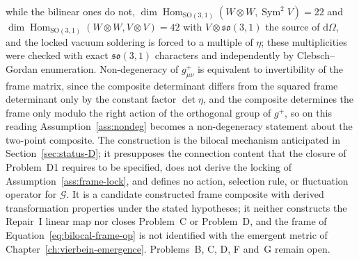while the bilinear ones do not,
$\dim\operatorname{Hom}_{\mathrm{SO}(3,1)}(W\otimes W,\operatorname{Sym}^{2}V)=22$ and
$\dim\operatorname{Hom}_{\mathrm{SO}(3,1)}(W\otimes W,V\otimes V)=42$ with $V\otimes\mathfrak{so}(3,1)$ the
source of $\mathrm{d}\Omega$, and the locked vacuum soldering is forced to a multiple of $\eta$;
these multiplicities were checked with exact $\mathfrak{so}(3,1)$ characters and independently
by Clebsch--Gordan enumeration. Non-degeneracy of $g^{+}_{\mu\nu}$ is equivalent to
invertibility of the frame matrix, since the composite determinant differs from the squared frame
determinant only by the constant factor $\det\eta$, and the composite determines the frame only modulo the right action of the
orthogonal group of $g^{+}$, so on this reading Assumption~\ref{ass:nondeg} becomes a
non-degeneracy statement about the two-point composite. The construction is the bilocal mechanism anticipated in
Section~\ref{sec:status-D}; it presupposes the connection content that the closure of
Problem~D1 requires to be specified, does not derive the locking of
Assumption~\ref{ass:frame-lock}, and defines no action, selection rule, or fluctuation operator
for $\mathcal G$. It is a candidate constructed frame composite with derived transformation
properties under the stated hypotheses; it neither constructs the Repair~I linear map nor closes
Problem~C or Problem~D, and the frame of Equation~\eqref{eq:bilocal-frame-op} is not identified
with the emergent metric of Chapter~\ref{ch:vierbein-emergence}. Problems~B, C, D, F and~G
remain open.

